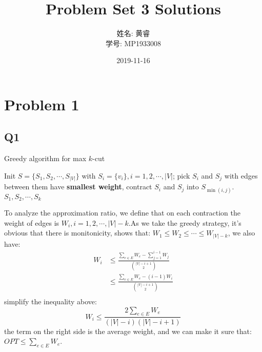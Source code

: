 \documentclass[a4paper, 12pt, titlepage]{article}
\begin{document}
\begin{CJK}{UTF8}{gbsn}
\title{Problem Set 3 Solutions}
\author{姓名: 黄睿 \\ 学号: MP1933008}
\date{2019-11-16}


\maketitle
\end{CJK}

\section{Problem 1}

\subsection{Q1}
\begin{algorithm}[h]
    \caption{Greedy algorithm for max $k$-cut}
    \begin{algorithmic}[1]
        \State Init $S = \{S_1, S_2, \cdots, S_{|V|} \}$ with $S_{i} = \{ v_{i} \}, i = 1, 2, \cdots, |V| $;
 			\State pick $S_{i}$ and $S_{j}$ with edges between them have {\bf smallest weight},  contract $S_{i}$ and $S_{j}$ into $S_{\min{(i, j)}}$.
        \EndWhile
        \State \Return $S_1, S_2, \cdots, S_{k}$
    \end{algorithmic}
\end{algorithm}

To analyze the approximation ratio, we define that on each contraction the weight of edges is $W_{i}, i= 1, 2, \cdots, |V|-k$.As we take the greedy strategy, it's obvious that there is monitonicity, shows that: $W_{1} \leq W_{2} \leq \cdots \leq W_{|V| - k}$, we also have:
\begin{equation}
	\begin{aligned}
		W_i &\leq \frac{\sum_{e \in E} W_e - \sum_{j = 1}^{i - 1} W_{j}}{\binom{|V| - i + 1}{2}} \\
			&\leq \frac{\sum_{e \in E} W_e - (i - 1) W_i}{\binom{|V| - i + 1}{2}} \\
	\end{aligned}
\end{equation}
simplify the inequality above:
\[
	W_i \leq \frac{2 \sum_{e \in E} W_{e}}{(|V| - i)(|V| -i + 1)}
\]
the term on the right side is the average weight, and we can make it sure that:$OPT \leq \sum_{e \in E} W_{e}$.
\end{document}

